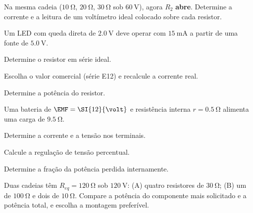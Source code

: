 \begin{questao}[3]{}

Na mesma cadeia ($\SI{10}{\ohm}$, $\SI{20}{\ohm}$, $\SI{30}{\ohm}$ sob
$\SI{60}{\volt}$), agora $R_2$ \textbf{abre}. Determine a corrente e a leitura
de um voltímetro ideal colocado sobre cada resistor.


\end{questao}
\begin{questao}[3]{}

Um LED com queda direta de $\SI{2.0}{\volt}$ deve operar com
$\SI{15}{\milli\ampere}$ a partir de uma fonte de $\SI{5.0}{\volt}$.
\begin{itensq}
\item Determine o resistor em série ideal.
\item Escolha o valor comercial (série E12) e recalcule a corrente real.
\item Determine a potência do resistor.
\end{itensq}


\end{questao}
\begin{questao}[3]{}

Uma bateria de $\EMF=\SI{12}{\volt}$ e resistência interna $r=\SI{0.5}{\ohm}$
alimenta uma carga de $\SI{9.5}{\ohm}$.
\begin{itensq}
\item Determine a corrente e a tensão nos terminais.
\item Calcule a regulação de tensão percentual.
\item Determine a fração da potência perdida internamente.
\end{itensq}


\end{questao}
\begin{questao}[3]{}

Duas cadeias têm $R_{eq}=\SI{120}{\ohm}$ sob $\SI{120}{\volt}$: (A) quatro
resistores de $\SI{30}{\ohm}$; (B) um de $\SI{100}{\ohm}$ e dois de
$\SI{10}{\ohm}$. Compare a potência do componente mais solicitado e a potência
total, e escolha a montagem preferível.


\end{questao}
